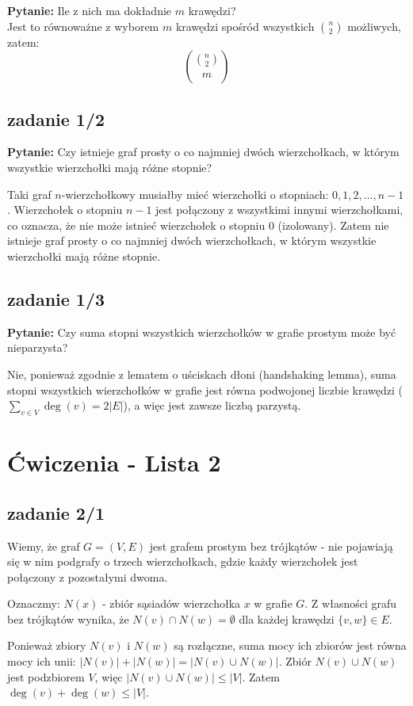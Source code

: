 \documentclass{article}
\begin{document}
\textbf{Pytanie:} Ile z nich ma dokładnie $m$ krawędzi? \\
Jest to równoważne z wyborem $m$ krawędzi spośród wszystkich $\binom{n}{2}$ możliwych, zatem:
\[
\binom{\binom{n}{2}}{m}
\]

\subsection*{zadanie 1/2}
\textbf{Pytanie:} Czy istnieje graf prosty o co najmniej dwóch wierzchołkach, w którym wszystkie wierzchołki mają różne stopnie?

Taki graf $n$-wierzchołkowy musiałby mieć wierzchołki o stopniach: $0, 1, 2, \dots, n-1$.
Wierzchołek o stopniu $n-1$ jest połączony z wszystkimi innymi wierzchołkami, co oznacza, że nie może istnieć wierzchołek o stopniu 0 (izolowany).
Zatem nie istnieje graf prosty o co najmniej dwóch wierzchołkach, w którym wszystkie wierzchołki mają różne stopnie.

\subsection*{zadanie 1/3}
\textbf{Pytanie:} Czy suma stopni wszystkich wierzchołków w grafie prostym może być nieparzysta?

Nie, ponieważ zgodnie z lematem o uściskach dłoni (handshaking lemma), suma stopni wszystkich wierzchołków w grafie jest równa podwojonej liczbie krawędzi ($ \sum_{v \in V} \deg(v) = 2|E| $), a więc jest zawsze liczbą parzystą.

\newpage
\section*{Ćwiczenia - Lista 2}
\subsection*{zadanie 2/1}
Wiemy, że graf $G = (V, E)$ jest grafem prostym bez trójkątów - nie pojawiają się w nim podgrafy o trzech wierzchołkach, gdzie każdy wierzchołek jest połączony z pozostałymi dwoma.

Oznaczmy: $N(x)$ - zbiór sąsiadów wierzchołka $x$ w grafie $G$. Z własności grafu bez trójkątów wynika, że $N(v) \cap N(w) = \emptyset$ dla każdej krawędzi $\{v, w\} \in E$.

Ponieważ zbiory $N(v)$ i $N(w)$ są rozłączne, suma mocy ich zbiorów jest równa mocy ich unii: $|N(v)| + |N(w)| = |N(v) \cup N(w)|$. Zbiór $N(v) \cup N(w)$ jest podzbiorem $V$, więc $|N(v) \cup N(w)| \leq |V|$.
Zatem $\deg(v) + \deg(w) \leq |V|$. \\
\end{document}
